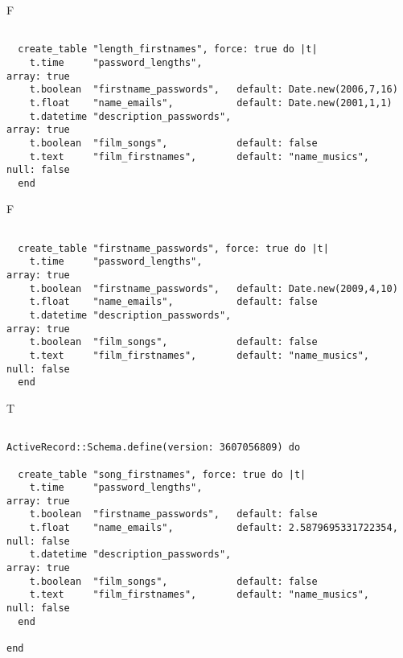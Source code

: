 F
\begin{verbatim}

  create_table "length_firstnames", force: true do |t|
    t.time     "password_lengths",                                                array: true
    t.boolean  "firstname_passwords",   default: Date.new(2006,7,16)
    t.float    "name_emails",           default: Date.new(2001,1,1)
    t.datetime "description_passwords",                                           array: true
    t.boolean  "film_songs",            default: false
    t.text     "film_firstnames",       default: "name_musics",      null: false
  end

\end{verbatim}

F
\begin{verbatim}

  create_table "firstname_passwords", force: true do |t|
    t.time     "password_lengths",                                                array: true
    t.boolean  "firstname_passwords",   default: Date.new(2009,4,10)
    t.float    "name_emails",           default: false
    t.datetime "description_passwords",                                           array: true
    t.boolean  "film_songs",            default: false
    t.text     "film_firstnames",       default: "name_musics",      null: false
  end

\end{verbatim}

T
\begin{verbatim}

ActiveRecord::Schema.define(version: 3607056809) do

  create_table "song_firstnames", force: true do |t|
    t.time     "password_lengths",                                                array: true
    t.boolean  "firstname_passwords",   default: false
    t.float    "name_emails",           default: 2.5879695331722354, null: false
    t.datetime "description_passwords",                                           array: true
    t.boolean  "film_songs",            default: false
    t.text     "film_firstnames",       default: "name_musics",      null: false
  end

end
\end{verbatim}
